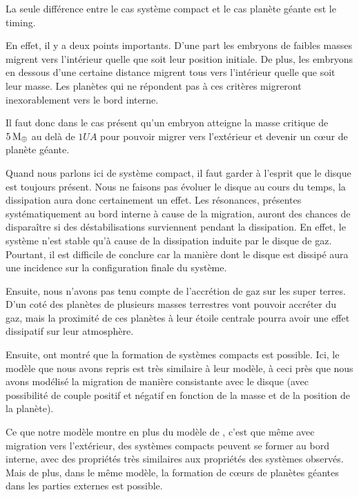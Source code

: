 La seule différence entre le cas système compact et le cas planète géante est le timing. 

En effet, il y a deux points importants. D'une part les embryons de faibles masses migrent vers l'intérieur quelle que soit leur position initiale. De plus, les embryons en dessous d'une certaine distance migrent tous vers l'intérieur quelle que soit leur masse. Les planètes qui ne répondent pas à ces critères migreront inexorablement vers le bord interne. 

Il faut donc dans le cas présent qu'un embryon atteigne la masse critique de $5\mathrm{\thinspace M_\oplus}$ au delà de $1\unit{UA}$ pour pouvoir migrer vers l'extérieur et devenir un cœur de planète géante.

\bigskip

Quand nous parlons ici de système compact, il faut garder à l'esprit que le disque est toujours présent. Nous ne faisons pas évoluer le disque au cours du temps, la dissipation aura donc certainement un effet. Les résonances, présentes systématiquement au bord interne à cause de la migration, auront des chances de disparaître si des déstabilisations surviennent pendant la dissipation. En effet, le système n'est stable qu'à cause de la dissipation induite par le disque de gaz. Pourtant, il est difficile de conclure car la manière dont le disque est dissipé aura une incidence sur la configuration finale du système. 

Ensuite, nous n'avons pas tenu compte de l'accrétion de gaz sur les super terres. D'un coté des planètes de plusieurs masses terrestres vont pouvoir accréter du gaz, mais la proximité de ces planètes à leur étoile centrale pourra avoir une effet dissipatif sur leur atmosphère. 

Ensuite, \cite{terquem2007migration} ont montré que la formation de systèmes compacts est possible. Ici, le modèle que nous avons repris est très similaire à leur modèle, à ceci près que nous avons modélisé la migration de manière consistante avec le disque (avec possibilité de couple positif et négatif en fonction de la masse et de la position de la planète). 

Ce que notre modèle montre en plus du modèle de \cite{terquem2007migration}, c'est que même avec migration vers l'extérieur, des systèmes compacts peuvent se former au bord interne, avec des propriétés très similaires aux propriétés des systèmes observés. Mais de plus, dans le même modèle, la formation de cœurs de planètes géantes dans les parties externes est possible. 


